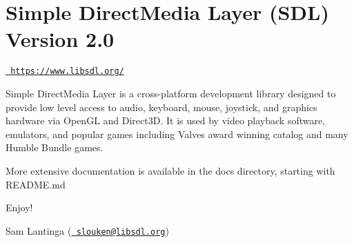 \chapter{Simple Direct\+Media Layer (SDL) Version 2.0}
\hypertarget{md_libraries_2sdl2_2_r_e_a_d_m_e}{}\label{md_libraries_2sdl2_2_r_e_a_d_m_e}
\label{md_libraries_2sdl2_2_r_e_a_d_m_e_autotoc_md494}%
%
 \href{https://www.libsdl.org/}{\texttt{ https\+://www.\+libsdl.\+org/}}

Simple Direct\+Media Layer is a cross-\/platform development library designed to provide low level access to audio, keyboard, mouse, joystick, and graphics hardware via Open\+GL and Direct3D. It is used by video playback software, emulators, and popular games including Valve\textquotesingle{}s award winning catalog and many Humble Bundle games.

More extensive documentation is available in the docs directory, starting with README.\+md

Enjoy!

Sam Lantinga (\href{mailto:slouken@libsdl.org}{\texttt{ slouken@libsdl.\+org}}) 